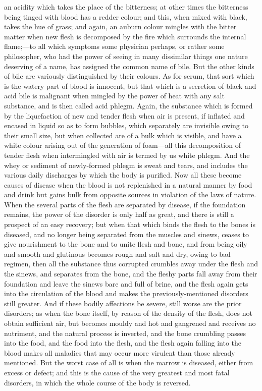 \documentclass[11pt,letter]{article}
\begin{document}
an acidity which takes the place of the bitterness; at other times the bitterness being tinged with blood has a redder colour; and this, when mixed with black, takes the hue of grass; and again, an auburn colour mingles with the bitter matter when new flesh is decomposed by the fire which surrounds the internal flame;—to all which symptoms some physician perhaps, or rather some philosopher, who had the power of seeing in many dissimilar things one nature deserving of a name, has assigned the common name of bile. But the other kinds of bile are variously distinguished by their colours. As for serum, that sort which is the watery part of blood is innocent, but that which is a secretion of black and acid bile is malignant when mingled by the power of heat with any salt substance, and is then called acid phlegm. Again, the substance which is formed by the liquefaction of new and tender flesh when air is present, if inflated and encased in liquid so as to form bubbles, which separately are invisible owing to their small size, but when collected are of a bulk which is visible, and have a white colour arising out of the generation of foam—all this decomposition of tender flesh when intermingled with air is termed by us white phlegm. And the whey or sediment of newly-formed phlegm is sweat and tears, and includes the various daily discharges by which the body is purified. Now all these become causes of disease when the blood is not replenished in a natural manner by food and drink but gains bulk from opposite sources in violation of the laws of nature. When the several parts of the flesh are separated by disease, if the foundation remains, the power of the disorder is only half as great, and there is still a prospect of an easy recovery; but when that which binds the flesh to the bones is diseased, and no longer being separated from the muscles and sinews, ceases to give nourishment to the bone and to unite flesh and bone, and from being oily and smooth and glutinous becomes rough and salt and dry, owing to bad regimen, then all the substance thus corrupted crumbles away under the flesh and the sinews, and separates from the bone, and the fleshy parts fall away from their foundation and leave the sinews bare and full of brine, and the flesh again gets into the circulation of the blood and makes the previously-mentioned disorders still greater. And if these bodily affections be severe, still worse are the prior disorders; as when the bone itself, by reason of the density of the flesh, does not obtain sufficient air, but becomes mouldy and hot and gangrened and receives no nutriment, and the natural process is inverted, and the bone crumbling passes into the food, and the food into the flesh, and the flesh again falling into the blood makes all maladies that may occur more virulent than those already mentioned. But the worst case of all is when the marrow is diseased, either from excess or defect; and this is the cause of the very greatest and most fatal disorders, in which the whole course of the body is reversed.
\end{document}
